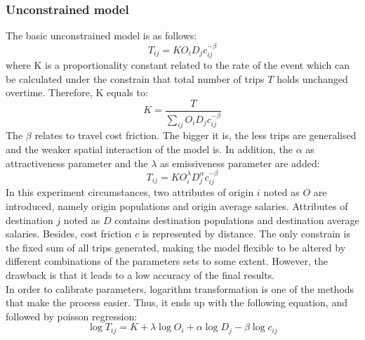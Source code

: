 \documentclass[a4paper,reqno,]{article}
\begin{document}
\subsubsection{Unconstrained model}
\label{sssec:unconstrained models}
The basic unconstrained model is as follows:
\begin{equation}
T_{ij} = K O_{i} D_{j} c_{ij}^{-\beta}
\end{equation}
where K is a proportionality constant related to the rate of the event which can be calculated under the constrain that total number of trips $T$ holds unchanged overtime. Therefore, K equals to:
\begin{equation}
K=\frac{T}{\sum\limits_{ij}{O_i D_j c_{ij}^{-\beta}}}
\end{equation}
The $\beta$ relates to travel cost friction. The bigger it is, the less trips are generalised and the weaker spatial interaction of the model is. In addition, the $\alpha$ as attractiveness parameter and the $\lambda$ as emissiveness parameter are added:
\begin{equation}
T_{ij}=KO_{i}^{\lambda}D_{j}^{\alpha}c_{ij}^{-\beta}
\end{equation}
In this experiment circumstances, two attributes of origin $i$ noted as $O$ are introduced, namely origin populations and origin average salaries. Attributes of destination $j$ noted as $D$ contains destination populations and destination average salaries. Besides, cost friction $c$ is represented by distance. The only constrain is the fixed sum of all trips generated, making the model flexible to be altered by different combinations of the parameters sets to some extent. However, the drawback is that it leads to a low accuracy of the final results.
\\In order to calibrate parameters, logarithm transformation is one of the methods that make the process easier. Thus, it ends up with the following equation, and followed by poisson regression: 
\begin{equation}
\log{T}_{ij} = K + \lambda\log{O}_i+\alpha\log{D}_j-\beta\log{c}_{ij}
\end{equation}
\end{document}
